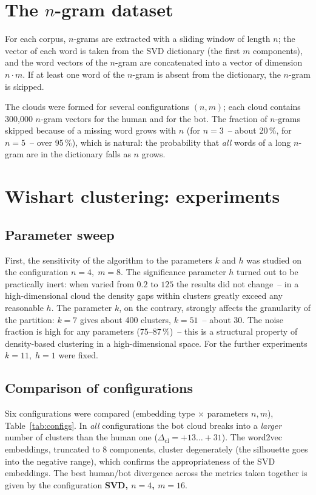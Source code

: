 \documentclass[12pt,a4paper]{article}
\begin{document}
\section{The $n$-gram dataset}

For each corpus, $n$-grams are extracted with a sliding window of length $n$;
the vector of each word is taken from the SVD dictionary (the first $m$
components), and the word vectors of the $n$-gram are concatenated into a vector
of dimension $n\cdot m$. If at least one word of the $n$-gram is absent from the
dictionary, the $n$-gram is skipped.

The clouds were formed for several configurations $(n,m)$; each cloud contains
300{,}000 $n$-gram vectors for the human and for the bot. The fraction of
$n$-grams skipped because of a missing word grows with $n$ (for $n=3$~-- about
20\,\%, for $n=5$~-- over 95\,\%), which is natural: the probability that
\emph{all} words of a long $n$-gram are in the dictionary falls as $n$ grows.

\section{Wishart clustering: experiments}

\subsection{Parameter sweep}

First, the sensitivity of the algorithm to the parameters $k$ and $h$ was
studied on the configuration $n=4,\;m=8$. The significance parameter $h$ turned
out to be practically inert: when varied from $0.2$ to $125$ the results did not
change~-- in a high-dimensional cloud the density gaps within clusters greatly
exceed any reasonable $h$. The parameter $k$, on the contrary, strongly affects
the granularity of the partition: $k=7$ gives about 400 clusters, $k=51$~-- about
30. The noise fraction is high for any parameters (75--87\,\%)~-- this is a
structural property of density-based clustering in a high-dimensional space. For
the further experiments $k=11,\;h=1$ were fixed.

\subsection{Comparison of configurations}

Six configurations were compared (embedding type $\times$ parameters $n,m$),
Table~\ref{tab:configs}. In \emph{all} configurations the bot cloud breaks into
a \emph{larger} number of clusters than the human one
($\Delta_{\text{cl}}=+13\ldots+31$). The word2vec embeddings, truncated to 8
components, cluster degenerately (the silhouette goes into the negative range),
which confirms the appropriateness of the SVD embeddings. The best human/bot
divergence across the metrics taken together is given by the configuration
\textbf{SVD, $n=4$, $m=16$}.
\end{document}
